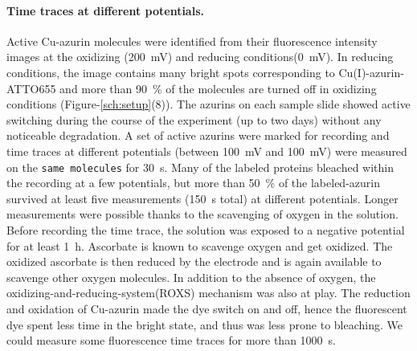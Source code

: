 \paragraph*{Time traces at different potentials.}
Active Cu-azurin molecules were identified from their fluorescence intensity images at the oxidizing (\SI{200}{\mV}) and reducing conditions(\SI{0}{\mV}).
In reducing conditions, the image contains many bright spots corresponding to Cu(I)-azurin-ATTO655 and more than \SI{90}{\percent} of the molecules are turned off in oxidizing conditions 
(Figure-\ref{sch:setup}(8)).
The azurins on each sample slide showed active switching during the course of the experiment (up to two days) without any noticeable degradation.
A set of active azurins were marked for recording and time traces at different potentials (between \SI{100}{\mV} and \SI{100}{\mV}) were measured on the \texttt{same molecules} 
for \SI{30}{\s}.
Many of the labeled proteins bleached within the recording at a few potentials, but more than \SI{50}{\percent} of the labeled-azurin survived at least five measurements (\SI{150}{\s}  total) at different potentials.
Longer measurements were possible thanks to the scavenging of oxygen in the solution.
Before recording the time trace, the solution was exposed to a negative potential for at least \SI{1}{\hour}.
Ascorbate is known to  scavenge oxygen\cite{dave1997effectiveness} and get oxidized.
The oxidized ascorbate is then reduced by the electrode and is again available to scavenge other oxygen molecules.
In addition to the absence of oxygen, the  oxidizing-and-reducing-system(ROXS) mechanism was also at play.\cite{cordes2009on}
The reduction and oxidation of Cu-azurin made the dye switch on and off, hence the fluorescent dye spent less time in the bright state, and thus was less prone to bleaching.
We could measure some fluorescence time traces for more than \SI{1000}{\s}.\\
